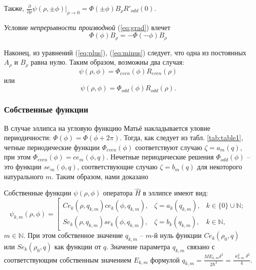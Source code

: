 Также, $\frac{\partial}{\partial \rho} \psi( \rho,\pm \phi)|_{\rho \to 0} = \Phi(\pm\phi) B_\rho R'_{odd}(0)$.

Условие \textit{непрерывности производной} (\ref{eq:grad}) влечет
\begin{equation}\label{eq:minus}
 \Phi(\phi) B_\rho = -\Phi(-\phi) B_\rho
\end{equation}

Наконец, из уравнений (\ref{eq:plus}), (\ref{eq:minus}) следует, что одна из постоянных $A_\rho$ и $B_\rho$ равна нулю.
Таким образом, возможны два случая:
\[ \psi(\rho,\phi) = \Phi_{even}(\phi) R_{even}(\rho)  \] 
или
\[ \psi(\rho,\phi) = \Phi_{odd}(\phi) R_{odd}(\rho) .  \]
\subsubsection{Собственные функции}\label{sec:ch1/sec2/sub2/sub1}
В случае эллипса на угловую функцию Матьё накладывается уловие периодичности: $\Phi(\phi) = \Phi(\phi+ 2 \pi)$. 
Тогда, как следует из табл. \ref{tab:table1}, четные периодические функции $\Phi_{even}(\phi)$ соответствуют случаю $\zeta = a_m(q)$, при этом $\Phi_{even}(\phi) = ce_m(\phi, q)$. 
Нечетные периодические решения $\Phi_{odd}(\phi)$ -- это функции 
$se_m(\phi, q)$, соответствующие случаю $\zeta = b_m(q)$ для некоторого натурального $m$. Таким образом, нами доказано
    
\begin{statement}
Собственные функции $\psi(\rho, \phi)$ оператора $\hat{H}$ в эллипсе имеют вид:
\[
    \psi_{k,m}(\rho, \phi) = \left[
    \begin{array}{cccc}
    Ce_k(\rho, q_{k,m})ce_k(\phi, q_{k,m}), & \zeta = a_k(q_{k, m}), & k \in \{0\} \cup \mathbb{N}; \\
    Se_k(\rho, q_{k,m})se_k(\phi, q_{k,m}), & \zeta = b_k(q_{k, m}), & k \in \mathbb{N},
    \end{array}
    \right.
\]
$m \in \mathbb{N}$. При этом собственное значение  $q_{k, m}$ -- $m$-й нуль функции $Ce_k(\rho_0, q)$ или $Se_k(\rho_0, q)$ как функции от $q$.
Значение параметра $q_{k,m}$ связано с соответствующим собственным значением $E_{k,m}$ формулой  $q_{k,m} = \frac{M E_{k,m}\delta^2}{2\hbar^2} = \frac{\varkappa_{k,m}^2\delta^2}{4}$. 
\end{statement}

